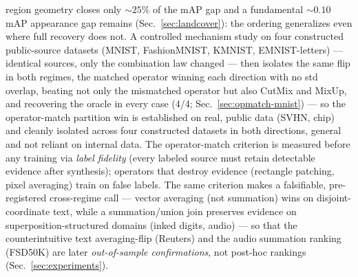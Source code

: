 \documentclass[11pt]{article}
\begin{document}
region geometry closes only ${\sim}25\%$ of the mAP gap and a fundamental ${\sim}0.10$ mAP
appearance gap remains (Sec.~\ref{sec:landcover}): the ordering generalizes even where full
recovery does not. A controlled mechanism study on four
constructed public-source datasets (MNIST, FashionMNIST, KMNIST, EMNIST-letters) --- identical
sources, only the combination law changed --- then isolates the same flip in both regimes,
the matched operator winning each direction with no std overlap, beating not only the
mismatched operator but also CutMix and MixUp, and recovering the oracle in every case (4/4;
Sec.~\ref{sec:opmatch-mnist}) --- so the operator-match partition win is established on real,
public data (SVHN, chip) and cleanly isolated across four constructed datasets in both
directions, general and not reliant on internal data. The
operator-match criterion is measured before any training via \emph{label fidelity}
(every labeled source must retain detectable evidence after synthesis); operators that
destroy evidence (rectangle patching, pixel averaging) train on false labels. The same
criterion makes a falsifiable, pre-registered cross-regime call --- vector averaging
(not summation) wins on disjoint-coordinate text, while a summation/union join
preserves evidence on superposition-structured domains (inked digits, audio) --- so
that the counterintuitive text averaging-flip (Reuters) and the audio summation
ranking (FSD50K) are later \emph{out-of-sample confirmations}, not post-hoc rankings
(Sec.~\ref{sec:experiments}).
\end{document}
